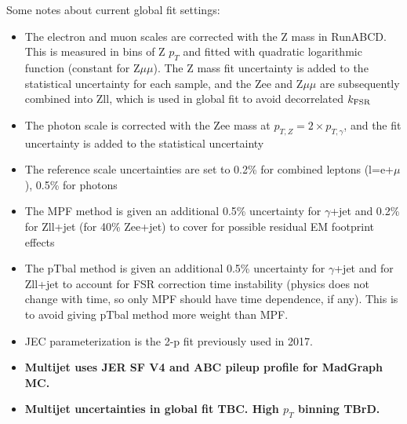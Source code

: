 \documentclass[landscape,10pt]{beamer} %
\begin{document}
\newpage

Some notes about current global fit settings:
\begin{itemize}
\item The electron and muon scales are corrected with the Z mass in RunABCD. This is measured in bins of Z $p_T$ and fitted with quadratic logarithmic function (constant for Z$\mu\mu$). The Z mass fit uncertainty is added to the statistical uncertainty for each sample, and the Zee and Z$\mu\mu$ are subsequently combined into Zll, which is used in global fit to avoid decorrelated $k_{\rm FSR}$
\item The photon scale is corrected with the Zee mass at $p_{T,Z}=2\times p_{T,\gamma}$, and the fit uncertainty is added to the statistical uncertainty
\item The reference scale uncertainties are set to 0.2\% for combined leptons (l=e+$\mu$), 0.5\% for photons
\item The MPF method is given an additional 0.5\% uncertainty for $\gamma$+jet and 0.2\% for Zll+jet (for 40\% Zee+jet) to cover for possible residual EM footprint effects
\item The pTbal method is given an additional 0.5\% uncertainty for $\gamma$+jet and for Zll+jet to account for FSR correction time instability (physics does not change with time, so only MPF should have time dependence, if any). This is to avoid giving pTbal method more weight than MPF.
\item JEC parameterization is the 2-p fit previously used in 2017.
\item {\bf Multijet uses JER SF V4 and ABC pileup profile for MadGraph MC.}
\item {\bf Multijet uncertainties in global fit TBC. High $p_T$ binning TBrD.}
\end{itemize}

\newpage
\end{document}
